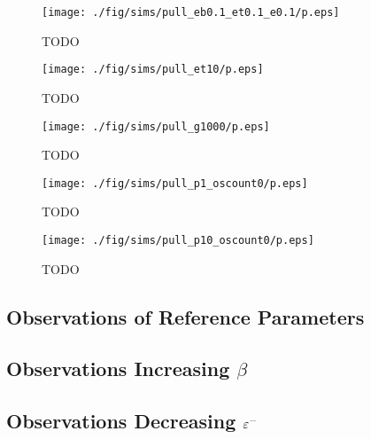 	\begin{figure}[h]
		\begin{center}
			\texttt{[image: ./fig/sims/pull\_eb0.1\_et0.1\_e0.1/p.eps]}
		\end{center}		
		\caption{ TODO
		\label{fig:PullGrid:eb0.1_et0.1_e0.1}}
	\end{figure}
	
	\begin{figure}[h]
		\begin{center}
			\texttt{[image: ./fig/sims/pull\_et10/p.eps]}
		\end{center}		
		\caption{ TODO
		\label{fig:PullGrid:et10}}
	\end{figure}
	
	\begin{figure}[h]
		\begin{center}
			\texttt{[image: ./fig/sims/pull\_g1000/p.eps]}
		\end{center}		
		\caption{ TODO
		\label{fig:PullGrid:g1000}}
	\end{figure}
	
	\begin{figure}[h]
		\begin{center}
			\texttt{[image: ./fig/sims/pull\_p1\_oscount0/p.eps]}
		\end{center}		
		\caption{ TODO
		\label{fig:PullGrid:p1}}
	\end{figure}
	
	\begin{figure}[h]
		\begin{center}
			\texttt{[image: ./fig/sims/pull\_p10\_oscount0/p.eps]}
		\end{center}		
		\caption{ TODO
		\label{fig:PullGrid:p10}}
	\end{figure}


\subsection{Observations of Reference Parameters}

\subsection{Observations Increasing $\beta$}

\subsection{Observations Decreasing $\varepsilon^-$}

